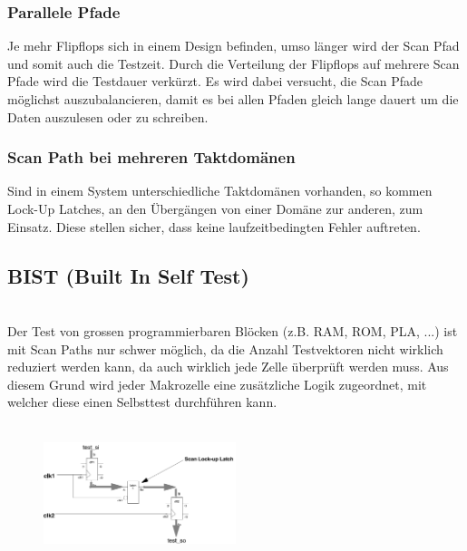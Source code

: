 \subsubsection{Parallele Pfade}
Je mehr Flipflops sich in einem Design befinden, umso länger wird der Scan Pfad und somit auch die Testzeit. Durch die Verteilung der Flipflops auf mehrere Scan Pfade wird die Testdauer verkürzt. Es wird dabei versucht, die Scan Pfade möglichst auszubalancieren, damit es bei allen Pfaden gleich lange dauert um die Daten auszulesen oder zu schreiben.

\begin{multicols}{2}
    \subsubsection{Scan Path bei mehreren Taktdomänen}
    Sind in einem System unterschiedliche Taktdomänen vorhanden, so kommen Lock-Up Latches, an den Übergängen von einer Domäne zur anderen, zum Einsatz. Diese stellen sicher, dass keine laufzeitbedingten Fehler auftreten.

    \subsection{BIST (Built In Self Test)}$~$ \\
    Der Test von grossen programmierbaren Blöcken (z.B. RAM, ROM, PLA, ...) ist mit Scan Paths nur schwer möglich, da die Anzahl Testvektoren nicht wirklich reduziert werden kann, da auch wirklich jede Zelle überprüft werden muss. Aus diesem Grund wird jeder Makrozelle eine zusätzliche Logik zugeordnet, mit welcher diese einen Selbsttest durchführen kann. \ \\ \ \\
    \begin{figure}[H]
        \includegraphics[width=0.5\textwidth]{images/scanpath_lookuplatch.png}
    \end{figure}
\end{multicols}

